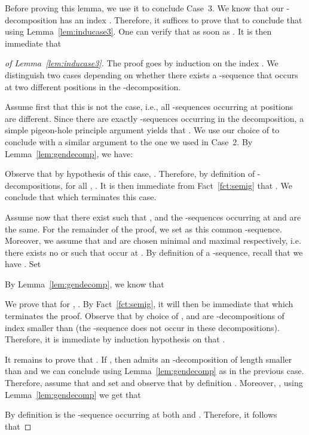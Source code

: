 \documentclass[envcountsame]{llncs}
\begin{document}
Before proving this lemma, we use it to conclude Case~3. We know that our
-decomposition  has an index . Therefore, it suffices to prove that  to conclude that
 using
Lemma~\ref{lem:inducase3}. One can verify that  as soon as . It is then immediate that


\begin{proof}[of Lemma~\ref{lem:inducase3}]
  The proof goes by induction on the index . We distinguish two cases
  depending on whether there exists a -sequence that occurs at two
  different positions in the -decomposition.

  Assume first that this is not the case, i.e., all -sequences occurring at
  positions  are different. Since there are exactly 
  -sequences occurring in the decomposition, a simple pigeon-hole
  principle argument yields that . We use our choice of
   to conclude with a similar argument to the one we used in
  Case~2. By Lemma~\ref{lem:gendecomp}, we have: 
  
  Observe that by hypothesis of this case, . Therefore, by definition of -decompositions,
  for all , . It is then immediate from
  Fact~\ref{fct:semig} that . We conclude that
   which terminates this case.



  \medskip
  Assume now that there exist  such that , and the
  -sequences occurring at  and  are the same. For the
  remainder of the proof, we set  as this
  common -sequence. Moreover, we assume that  and  are
  chosen minimal and maximal respectively, i.e. there exists no
   or  such that  occur
  at . By definition of a -sequence, recall that we have
  . Set
  
  By Lemma~\ref{lem:gendecomp}, we know that
  
  We prove that for , . By Fact~\ref{fct:semig}, it will
  then be immediate that  which terminates the proof. Observe
  that by choice of ,  and  are -decompositions of index smaller than  (the
  -sequence  does not occur in these
  decompositions). Therefore, it is immediate by induction hypothesis on
   that .

  \medskip
  It remains to prove that . If , then 
  admits an -decomposition of length smaller than  and
  we can conclude using Lemma~\ref{lem:gendecomp} as in the previous
  case. Therefore, assume that  and set  and observe that by definition . Moreover,
  , using
  Lemma~\ref{lem:gendecomp} we get that  
  
  By definition  is the -sequence occurring
  at both  and . Therefore, it follows that 
  

\end{proof}
\end{document}
